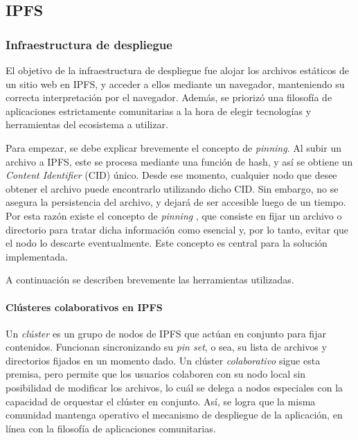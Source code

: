 \subsection{IPFS}

\subsubsection{Infraestructura de despliegue}

El objetivo de la infraestructura de despliegue fue alojar los archivos estáticos de un sitio web en IPFS, y acceder a ellos mediante un navegador, manteniendo su correcta interpretación por el navegador. Además, se priorizó una filosofía de aplicaciones estrictamente comunitarias a la hora de elegir tecnologías y herramientas del ecosistema a utilizar.

Para empezar, se debe explicar brevemente el concepto de \textit{pinning}. Al subir un archivo a IPFS, este se procesa mediante una función de hash, y así se obtiene un \textit{Content Identifier} (CID) único. Desde ese momento, cualquier nodo que desee obtener el archivo puede encontrarlo utilizando dicho CID. Sin embargo, no se asegura la persistencia del archivo, y dejará de ser accesible luego de un tiempo. Por esta razón existe el concepto de \textit{pinning} \cite{pinning}, que consiste en fijar un archivo o directorio para tratar dicha información como esencial y, por lo tanto, evitar que el nodo lo descarte eventualmente. Este concepto es central para la solución implementada.

A continuación se describen brevemente las herramientas utilizadas.

\paragraph{Clústeres colaborativos en IPFS} Un \textit{clúster} es un grupo de nodos de IPFS que actúan en conjunto para fijar contenidos. Funcionan sincronizando su \textit{pin set}, o sea, su lista de archivos y directorios fijados en un momento dado. Un clúster \textit{colaborativo} sigue esta premisa, pero permite que los usuarios colaboren con su nodo local sin posibilidad de modificar los archivos, lo cuál se delega a nodos especiales con la capacidad de orquestar el clúster en conjunto. Así, se logra que la misma comunidad mantenga operativo el mecanismo de despliegue de la aplicación, en línea con la filosofía de aplicaciones comunitarias.



